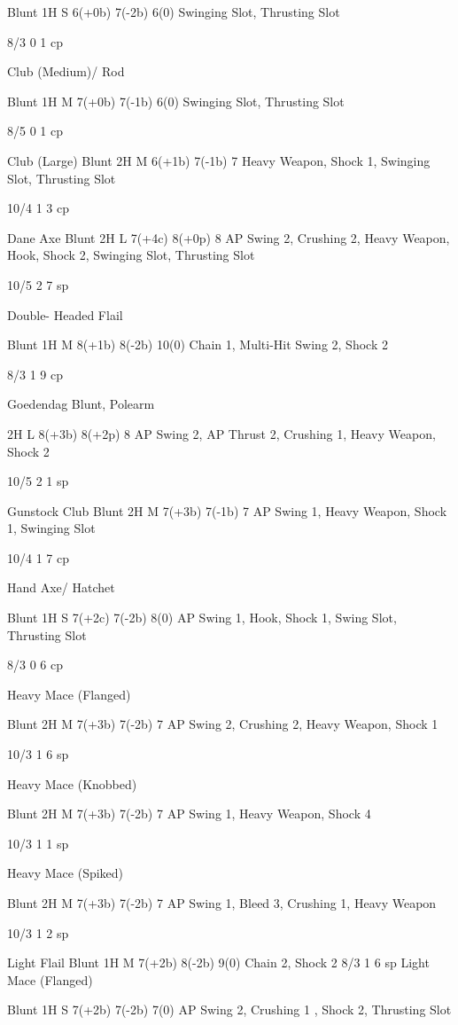 \documentclass[oneside,11pt,english]{book}
\begin{document}
Blunt 1H S 6(+0b) 7(-2b) 6(0) Swinging Slot, 
Thrusting Slot 

8/3 0 1 cp 

Club 
(Medium)/ 
Rod 

Blunt 1H M 7(+0b) 7(-1b) 6(0) Swinging Slot, 
Thrusting Slot 

8/5 0 1 cp 

Club (Large) Blunt 2H M 6(+1b) 7(-1b) 7 Heavy Weapon, Shock 
1, Swinging Slot, 
Thrusting Slot 

10/4 1 3 cp 

Dane Axe Blunt 2H L 7(+4c) 8(+0p) 8 AP Swing 2, Crushing 
2, Heavy Weapon, 
Hook, Shock 2, 
Swinging Slot, 
Thrusting Slot 

10/5 2 7 sp 

Double-
Headed Flail 

Blunt 1H M 8(+1b) 8(-2b) 10(0) Chain 1, Multi-Hit 
Swing 2, Shock 2 

8/3 1 9 cp 

Goedendag Blunt, 
Polearm 

2H L 8(+3b) 8(+2p) 8 AP Swing 2, AP Thrust 
2, Crushing 1, Heavy 
Weapon, Shock 2 

10/5 2 1 sp 

Gunstock Club Blunt 2H M 7(+3b) 7(-1b) 7 AP Swing 1, Heavy 
Weapon, Shock 1, 
Swinging Slot 

10/4 1 7 cp 

Hand Axe/ 
Hatchet 

Blunt 1H S 7(+2c) 7(-2b) 8(0) AP Swing 1, Hook, 
Shock 1, Swing Slot, 
Thrusting Slot 

8/3 0 6 cp 

Heavy Mace 
(Flanged) 

Blunt 2H M 7(+3b) 7(-2b) 7 AP Swing 2, Crushing 
2, Heavy Weapon, 
Shock 1 

10/3 1 6 sp 

Heavy Mace 
(Knobbed) 

Blunt 2H M 7(+3b) 7(-2b) 7 AP Swing 1, Heavy 
Weapon, Shock 4 

10/3 1 1 sp 

Heavy Mace 
(Spiked) 

Blunt 2H M 7(+3b) 7(-2b) 7 AP Swing 1, Bleed 3, 
Crushing 1, Heavy 
Weapon 

10/3 1 2 sp 

Light Flail Blunt 1H M 7(+2b) 8(-2b) 9(0) Chain 2, Shock 2 8/3 1 6 sp 
Light Mace 
(Flanged) 

Blunt 1H S 7(+2b) 7(-2b) 7(0) AP Swing 2, Crushing 1 
, Shock 2, Thrusting 
Slot 
\end{document}
